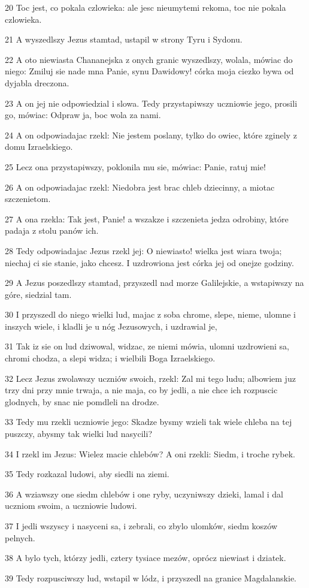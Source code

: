 \par 20 Toc jest, co pokala czlowieka: ale jesc nieumytemi rekoma, toc nie pokala czlowieka.
\par 21 A wyszedlszy Jezus stamtad, ustapil w strony Tyru i Sydonu.
\par 22 A oto niewiasta Chananejska z onych granic wyszedlszy, wolala, mówiac do niego: Zmiluj sie nade mna Panie, synu Dawidowy! córka moja ciezko bywa od dyjabla dreczona.
\par 23 A on jej nie odpowiedzial i slowa. Tedy przystapiwszy uczniowie jego, prosili go, mówiac: Odpraw ja, boc wola za nami.
\par 24 A on odpowiadajac rzekl: Nie jestem poslany, tylko do owiec, które zginely z domu Izraelskiego.
\par 25 Lecz ona przystapiwszy, poklonila mu sie, mówiac: Panie, ratuj mie!
\par 26 A on odpowiadajac rzekl: Niedobra jest brac chleb dziecinny, a miotac szczenietom.
\par 27 A ona rzekla: Tak jest, Panie! a wszakze i szczenieta jedza odrobiny, które padaja z stolu panów ich.
\par 28 Tedy odpowiadajac Jezus rzekl jej: O niewiasto! wielka jest wiara twoja; niechaj ci sie stanie, jako chcesz. I uzdrowiona jest córka jej od onejze godziny.
\par 29 A Jezus poszedlszy stamtad, przyszedl nad morze Galilejskie, a wstapiwszy na góre, siedzial tam.
\par 30 I przyszedl do niego wielki lud, majac z soba chrome, slepe, nieme, ulomne i inszych wiele, i kladli je u nóg Jezusowych, i uzdrawial je,
\par 31 Tak iz sie on lud dziwowal, widzac, ze niemi mówia, ulomni uzdrowieni sa, chromi chodza, a slepi widza; i wielbili Boga Izraelskiego.
\par 32 Lecz Jezus zwolawszy uczniów swoich, rzekl: Zal mi tego ludu; albowiem juz trzy dni przy mnie trwaja, a nie maja, co by jedli, a nie chce ich rozpuscic glodnych, by snac nie pomdleli na drodze.
\par 33 Tedy mu rzekli uczniowie jego: Skadze bysmy wzieli tak wiele chleba na tej puszczy, abysmy tak wielki lud nasycili?
\par 34 I rzekl im Jezus: Wielez macie chlebów? A oni rzekli: Siedm, i troche rybek.
\par 35 Tedy rozkazal ludowi, aby siedli na ziemi.
\par 36 A wziawszy one siedm chlebów i one ryby, uczyniwszy dzieki, lamal i dal uczniom swoim, a uczniowie ludowi.
\par 37 I jedli wszyscy i nasyceni sa, i zebrali, co zbylo ulomków, siedm koszów pelnych.
\par 38 A bylo tych, którzy jedli, cztery tysiace mezów, oprócz niewiast i dziatek.
\par 39 Tedy rozpusciwszy lud, wstapil w lódz, i przyszedl na granice Magdalanskie.

